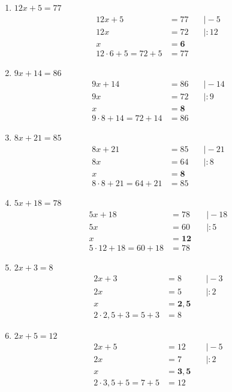 \documentclass[a4paper,10pt]{article} %
\begin{document}
\begin{enumerate}[label=\alph*)]
  \item \(12x + 5 = 77\)
  \[
  \begin{aligned}
    12x + 5 &= 77 &\quad\big| - 5 \\
    12x &= 72 &\quad\big| : 12 \\
    x &= \mathbf{6} \\
    12 \cdot 6 + 5 = 72 + 5 &= 77
  \end{aligned}
  \]

  \item \(9x + 14 = 86\)
  \[
  \begin{aligned}
    9x + 14 &= 86 &\quad\big| - 14 \\
    9x &= 72 &\quad\big| : 9 \\
    x &= \mathbf{8} \\
    9 \cdot 8 + 14 = 72 + 14 &= 86
  \end{aligned}
  \]

  \item \(8x + 21 = 85\)
  \[
  \begin{aligned}
    8x + 21 &= 85 &\quad\big| - 21 \\
    8x &= 64 &\quad\big| : 8 \\
    x &= \mathbf{8} \\
    8 \cdot 8 + 21 = 64 + 21 &= 85
  \end{aligned}
  \]

  \item \(5x + 18 = 78\)
  \[
  \begin{aligned}
    5x + 18 &= 78 &\quad\big| - 18 \\
    5x &= 60 &\quad\big| : 5 \\
    x &= \mathbf{12} \\
    5 \cdot 12 + 18 = 60 + 18 &= 78
  \end{aligned}
  \]

  \item \(2x + 3 = 8\)
  \[
  \begin{aligned}
    2x + 3 &= 8 &\quad\big| - 3 \\
    2x &= 5 &\quad\big| : 2 \\
    x &= \mathbf{2,5} \\
    2 \cdot 2,5 + 3 = 5 + 3 &= 8
  \end{aligned}
  \]

  \item \(2x + 5 = 12\)
  \[
  \begin{aligned}
    2x + 5 &= 12 &\quad\big| - 5 \\
    2x &= 7 &\quad\big| : 2 \\
    x &= \mathbf{3,5} \\
    2 \cdot 3,5 + 5 = 7 + 5 &= 12
  \end{aligned}
  \]


\end{enumerate}
\end{document}
